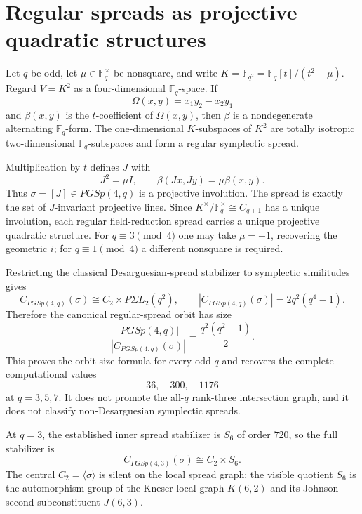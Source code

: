 \section*{Regular spreads as projective quadratic structures}

Let $q$ be odd, let $\mu\in\mathbb F_q^\times$ be nonsquare, and write
$K=\mathbb F_{q^2}=\mathbb F_q[t]/(t^2-\mu)$.  Regard $V=K^2$ as a
four-dimensional $\mathbb F_q$-space.  If
\[
\Omega(x,y)=x_1y_2-x_2y_1
\]
and $\beta(x,y)$ is the $t$-coefficient of $\Omega(x,y)$, then $\beta$ is a
nondegenerate alternating $\mathbb F_q$-form.  The one-dimensional
$K$-subspaces of $K^2$ are totally isotropic two-dimensional
$\mathbb F_q$-subspaces and form a regular symplectic spread.

Multiplication by $t$ defines $J$ with
\[
J^2=\mu I,
\qquad
\beta(Jx,Jy)=\mu\beta(x,y).
\]
Thus $\sigma=[J]\in PGSp(4,q)$ is a projective involution.  The spread is
exactly the set of $J$-invariant projective lines.  Since
$K^\times/\mathbb F_q^\times\cong C_{q+1}$ has a unique involution, each
regular field-reduction spread carries a unique projective quadratic structure.
For $q\equiv3\pmod4$ one may take $\mu=-1$, recovering the geometric $i$;
for $q\equiv1\pmod4$ a different nonsquare is required.

Restricting the classical Desarguesian-spread stabilizer to symplectic
similitudes gives
\[
C_{PGSp(4,q)}(\sigma)
\cong C_2\times P\Sigma L_2(q^2),
\qquad
\left|C_{PGSp(4,q)}(\sigma)\right|=2q^2(q^4-1).
\]
Therefore the canonical regular-spread orbit has size
\[
\boxed{
\frac{|PGSp(4,q)|}{|C_{PGSp(4,q)}(\sigma)|}
=\frac{q^2(q^2-1)}2.
}
\]
This proves the orbit-size formula for every odd $q$ and recovers the complete
computational values
\[
36,\quad300,\quad1176
\]
at $q=3,5,7$.  It does not promote the all-$q$ rank-three intersection graph,
and it does not classify non-Desarguesian symplectic spreads.

At $q=3$, the established inner spread stabilizer is $S_6$ of order $720$,
so the full stabilizer is
\[
\boxed{C_{PGSp(4,3)}(\sigma)\cong C_2\times S_6.}
\]
The central $C_2=\langle\sigma\rangle$ is silent on the local spread graph;
the visible quotient $S_6$ is the automorphism group of the Kneser local graph
$K(6,2)$ and its Johnson second subconstituent $J(6,3)$.

